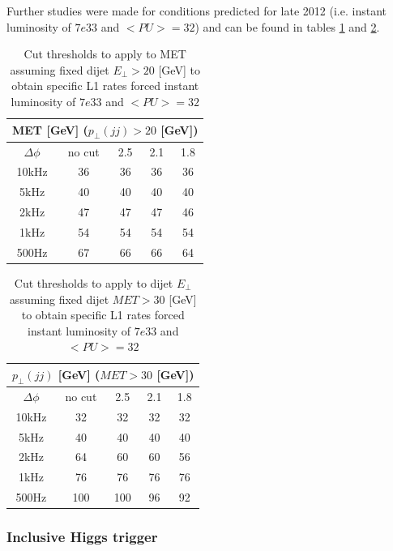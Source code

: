 \documentclass[%
reprint,
amsmath,
amssymb,
aps,
pra,
showkeys
]{revtex4-1}
\begin{document}
Further studies were made for conditions predicted for late 2012 (i.e. instant luminosity of $7e33$ and $<PU>=32$)
and can be found in tables \ref{table_7E33_PU32_fixedDijet} and \ref{table_7E33_PU32_fixedMET}.

\begin{table}
\begin{tabular}{|c||c|c|c|c|}
\hline
\multicolumn{5}{|c|}{MET [GeV] ($p_\bot(jj)>20$ [GeV])} \\
\hline
$\Delta\phi$ & no cut & 2.5 & 2.1 & 1.8 \\
\hline
10kHz        &     36 &  36 &  36 &  36 \\
5kHz         &     40 &  40 &  40 &  40 \\
2kHz         &     47 &  47 &  47 &  46 \\
1kHz         &     54 &  54 &  54 &  54 \\
500Hz        &     67 &  66 &  66 &  64 \\
\hline
\end{tabular}
\caption{Cut thresholds to apply to MET assuming fixed dijet $E_\bot>20$ [GeV] to obtain specific L1 rates forced
instant luminosity of $7e33$ and $<PU>=32$}
\label{table_7E33_PU32_fixedDijet}
\end{table}

\begin{table}
\begin{tabular}{|c||c|c|c|c|}
\hline
\multicolumn{5}{|c|}{$p_\bot(jj)$ [GeV] ($MET>30$ [GeV])} \\
\hline
$\Delta\phi$ & no cut & 2.5 & 2.1 & 1.8 \\
\hline
10kHz        &     32 &  32 &  32 &  32 \\
5kHz         &     40 &  40 &  40 &  40 \\
2kHz         &     64 &  60 &  60 &  56 \\
1kHz         &     76 &  76 &  76 &  76 \\
500Hz        &    100 & 100 &  96 &  92 \\
\hline
\end{tabular}
\caption{Cut thresholds to apply to dijet $E_\bot$ assuming fixed dijet $MET>30$ [GeV] to obtain specific L1 rates 
forced instant luminosity of $7e33$ and $<PU>=32$}
\label{table_7E33_PU32_fixedMET}
\end{table}

\subsubsection{Inclusive Higgs trigger}
\end{document}
